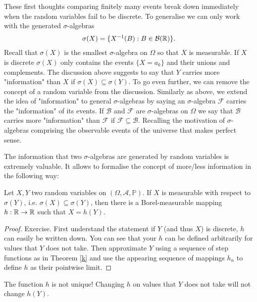 	These first thoughts comparing finitely many events break down immediately when the random variables fail to be discrete. To generalise we can only work with the generated $\sigma$-algebras
	\begin{align*}
		\sigma(X)=\{ X^{-1}(B): B\in \mathcal B(\mathbb{R})\}.
	\end{align*}
	Recall that $\sigma(X)$ is the smallest $\sigma$-algebra on $\Omega$ so that $X$ is measurable. If $X$ is discrete $\sigma(X)$ only contains the events $\{X=a_k\}$ and their unions and complements. The discussion above suggests to say that $Y$ carries more "{}information"{} than $X$ if $\sigma(X)\subseteq \sigma (Y)$. To go even further, we can remove the concept of a random variable from the discussion. Similarly as above, we extend the idea of "{}information"{} to general $\sigma$-algebras by saying an $\sigma$-algebra $\mathcal F$ carries the "{}information"{} of its events. If $\mathcal B$ and $\mathcal F$ are $\sigma$-algebras on $\Omega$ we say that $\mathcal B$ carries more "{}information"{} than $\mathcal F$ if $\mathcal F\subseteq \mathcal B$. Recalling the motivation of $\sigma$-algebras comprising the observable events of the universe that makes perfect sense.\smallskip
	
The information that two $\sigma$-algebras are generated by random variables is extremely valuable. It allows to formalise the concept of more/less information in the following way:
\begin{lAussageWerkzeug}
\begin{lemma}
		Let $X, Y$ two random variables on $(\Omega, \mathcal A, \mathbb P)$. If $X$ is measurable with respect to $\sigma(Y)$, i.e. $\sigma(X)\subseteq \sigma(Y)$, then there is a Borel-measurable mapping $h:\mathbb{R}\to\mathbb{R}$ such that $X=h(Y)$.
	\end{lemma}
\end{lAussageWerkzeug}
	\begin{proof}[Proof]
		Exercise. First understand the statement if $Y$ (and thus $X$) is discrete, $h$ can easily be written down. You can see that your $h$ can be defined arbitrarily for values that $Y$ does not take. Then approximate $Y$ using a sequence of step functions as in Theorem \ref{k} and use the appearing sequence of mappings $h_n$ to define $h$ as their pointwise limit.
	\end{proof}	
	\begin{lwarnhinweis}
		The function $h$ is not unique! Changing $h$ on values that $Y$ does not take will not change $h(Y)$.
	\end{lwarnhinweis}

